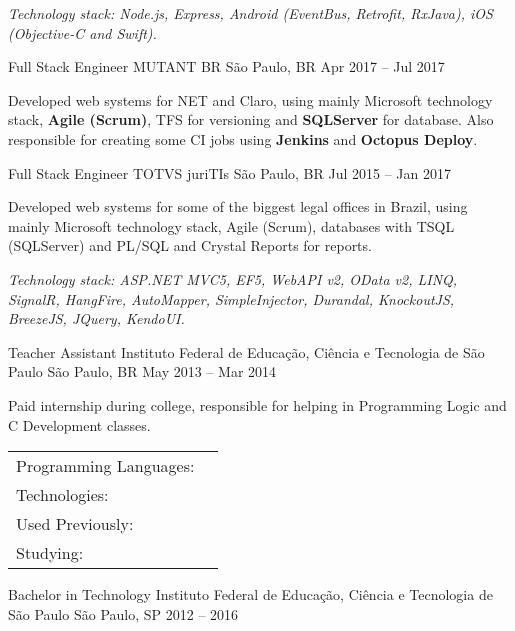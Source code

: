 \documentclass[]{awesome-cv}
\begin{document}
\begin{cventries}
{\begin{cvitems}
		\item \textit{Technology stack: Node.js, Express, Android (EventBus, Retrofit, RxJava), iOS (Objective-C and Swift).}
		\end{cvitems}}
	\cventry
	{Full Stack Engineer}
	{MUTANT BR}
	{São Paulo, BR}
	{Apr 2017 – Jul 2017}
	{\begin{cvitems}
		\item {Developed web systems for NET and Claro, using mainly Microsoft technology stack, \textbf{Agile (Scrum)}, TFS for versioning and \textbf{SQLServer} for database. Also responsible for creating some CI jobs using \textbf{Jenkins} and \textbf{Octopus Deploy}.}
		\end{cvitems}}
	\cventry
	{Full Stack Engineer}
	{TOTVS juriTIs}
	{São Paulo, BR}
	{Jul 2015 – Jan 2017}
	{\begin{cvitems}
		\item {Developed web systems for some of the biggest legal offices in Brazil, using mainly Microsoft technology stack, Agile (Scrum), databases with TSQL (SQLServer) and PL/SQL and Crystal Reports for reports.}
		\item \textit{Technology stack: ASP.NET MVC5, EF5, WebAPI v2, OData v2, LINQ, SignalR, HangFire, AutoMapper, SimpleInjector, Durandal, KnockoutJS, BreezeJS, JQuery, KendoUI.}
		\end{cvitems}}
	\cventry
	{Teacher Assistant}
	{Instituto Federal de Educação, Ciência e Tecnologia de São Paulo}
	{São Paulo, BR}
	{May 2013 – Mar 2014}
	{\begin{cvitems}
		\item Paid internship during college, responsible for helping in Programming Logic and C Development classes.
		\end{cvitems}}
\end{cventries}
\begin{cventries}
	\cventry
	{}
	{\def\arraystretch{1.15}{\begin{tabular}{ l l }
		Programming Languages: {\skill{ C\#, JavaScript, TypeScript }} \\
		Technologies: {\skill{ Azure, Docker, Kubernetes, ELK, Pulumi, Terraform, SQL (MS SQLServer, Postgre), No-SQL (CosmosDB, MongoDB) }} \\
		Used Previously: {\skill{Clojure, Go, Java, Python}} \\
		Studying: {\skill{ Rust, F\# }} \\
		\end{tabular}}}
	{}
	{}
	{}
\end{cventries}

\vspace{-9mm}
\begin{cventries}
	\cventry
	{Bachelor in Technology}
	{Instituto Federal de Educação, Ciência e Tecnologia de São Paulo}
	{São Paulo, SP}
	{2012 – 2016}
	{}
\end{cventries}
\end{document}
